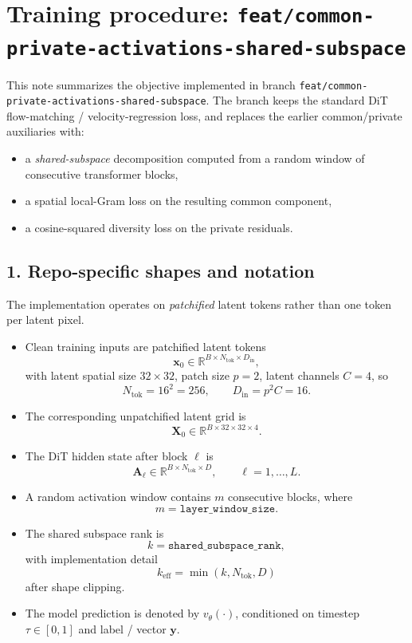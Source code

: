 \documentclass[11pt]{article}
\begin{document}
\section*{Training procedure: \texttt{feat/common-private-activations-shared-subspace}}

This note summarizes the objective implemented in branch \texttt{feat/common-private-activations-shared-subspace}. The branch keeps the standard DiT flow-matching / velocity-regression loss, and replaces the earlier common/private auxiliaries with:
\begin{itemize}
  \item a \emph{shared-subspace} decomposition computed from a random window of consecutive transformer blocks,
  \item a spatial local-Gram loss on the resulting common component,
  \item a cosine-squared diversity loss on the private residuals.
\end{itemize}

\subsection*{1. Repo-specific shapes and notation}
The implementation operates on \emph{patchified} latent tokens rather than one token per latent pixel.
\begin{itemize}
  \item Clean training inputs are patchified latent tokens
  \[
    \bm{x}_0 \in \mathbb{R}^{B\times N_{\mathrm{tok}}\times D_{\mathrm{in}}},
  \]
  with latent spatial size $32\times 32$, patch size $p=2$, latent channels $C=4$, so
  \[
    N_{\mathrm{tok}} = 16^2 = 256,
    \qquad
    D_{\mathrm{in}} = p^2 C = 16.
  \]
  \item The corresponding unpatchified latent grid is
  \[
    \bm{X}_0 \in \mathbb{R}^{B\times 32\times 32\times 4}.
  \]
  \item The DiT hidden state after block $\ell$ is
  \[
    \bm{A}_\ell \in \mathbb{R}^{B\times N_{\mathrm{tok}}\times D},
    \qquad \ell=1,\dots,L.
  \]
  \item A random activation window contains $m$ consecutive blocks, where
  \[
    m = \texttt{layer\_window\_size}.
  \]
  \item The shared subspace rank is
  \[
    k = \texttt{shared\_subspace\_rank},
  \]
  with implementation detail
  \[
    k_{\mathrm{eff}} = \min(k, N_{\mathrm{tok}}, D)
  \]
  after shape clipping.
  \item The model prediction is denoted by $v_\theta(\cdot)$, conditioned on timestep $\tau\in[0,1]$ and label / vector $\bm{y}$.
\end{itemize}
\end{document}
